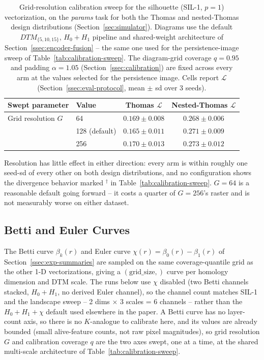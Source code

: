 \documentclass[11pt,letterpaper]{article}
\newcommand{\1}{\mathds{1}}
\theoremstyle{plain}
\theoremstyle{definitioncolon}
\begin{document}
\begin{table}[tbp]
\centering
\small
\begin{tabular}{llcc}
\toprule
Swept parameter & Value & Thomas $\mathcal{L}$ & Nested-Thomas $\mathcal{L}$ \\
\midrule
Grid resolution $G$
  & 64             & $0.169 \pm 0.008$ & $0.268 \pm 0.006$ \\
  & 128 (default)  & $0.165 \pm 0.011$ & $0.271 \pm 0.009$ \\
  & 256            & $0.170 \pm 0.013$ & $0.273 \pm 0.012$ \\
\bottomrule
\end{tabular}
\caption{Grid-resolution calibration sweep for the silhouette (SIL-1, $p=1$)
vectorization, on the \emph{params} task for both the Thomas and
nested-Thomas design distributions (Section~\ref{sec:simulator}). Diagrams
use the default $DTM_{\{5,10,15\}}$, $H_0{+}H_1$ pipeline and shared-weight
architecture of Section~\ref{ssec:encoder-fusion} -- the same one used for
the persistence-image sweep of Table~\ref{tab:calibration-sweep}. The
diagram-grid coverage $q=0.95$ and padding $\alpha=1.05$
(Section~\ref{ssec:calibration}) are fixed across every arm at the values
selected for the persistence image. Cells report $\mathcal{L}$
(Section~\ref{ssec:eval-protocol}, mean $\pm$ sd over 3 seeds).}
\label{tab:calibration-sweep-silhouette}
\end{table}

Resolution has little effect in either direction: every arm is within
roughly one seed-sd of every other on both design distributions, and no
configuration shows the divergence behavior marked $^\dagger$ in
Table~\ref{tab:calibration-sweep}. $G=64$ is a reasonable default going
forward -- it costs a quarter of $G=256$'s raster and is not measurably worse
on either dataset.
\subsection{Betti and Euler Curves}
\label{app:calib-betti}

The Betti curve $\beta_k(r)$ and Euler curve $\chi(r) = \beta_0(r) -
\beta_1(r)$ of Section~\ref{ssec:exp-summaries} are sampled on the same
coverage-quantile grid as the other 1-D vectorizations, giving a
$(\text{grid\_size},)$ curve per homology dimension and DTM scale. The runs
below use $\chi$ disabled (two Betti channels stacked, $H_0{+}H_1$, no
derived Euler channel), so the channel count matches SIL-1 and the landscape
sweep -- 2 dims $\times$ 3 scales = 6 channels -- rather than the
$H_0{+}H_1{+}\chi$ default used elsewhere in the paper. A Betti curve has no
layer-count axis, so there is no $K$-analogue to calibrate here, and its
values are already bounded (small alive-feature counts, not raw pixel
magnitudes), so grid resolution $G$ and calibration coverage $q$ are the two
axes swept, one at a time, at the shared multi-scale architecture of
Table~\ref{tab:calibration-sweep}.
\end{document}
